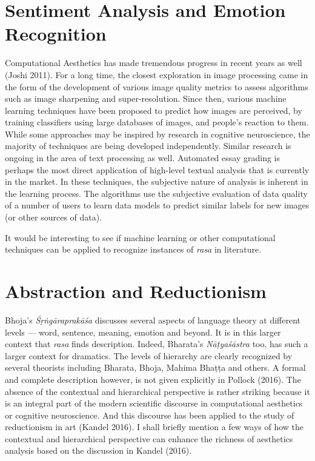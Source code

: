 \section*{Sentiment Analysis and Emotion Recognition}

Computational Aesthetics has made tremendous progress in recent years as well (Joshi 2011). For a long time, the closest exploration in image processing came in the form of the development of various image quality metrics to assess algorithms such as image sharpening and super-resolution. Since then, various machine learning techniques have been proposed to predict how images are perceived, by training classifiers using large databases of images, and people’s reaction to them. While some approaches may be inspired by research in cognitive neuroscience, the majority of techniques are being developed independently. Similar research is ongoing in the area of text processing as well. Automated essay grading is perhaps the most direct application of high-level textual analysis that is currently in the market. In these techniques, the subjective nature of analysis is inherent in the learning process. The algorithms use the subjective evaluation of data quality of a number of users to learn data models to predict similar labels for new images (or other sources of data).

It would be interesting to see if machine learning or other computational techniques can be applied to recognize instances of \textsl{rasa} in literature.\\[-21pt]

\section*{Abstraction and Reductionism}

Bhoja’s \textsl{Śṛṅgāraprakāśa} discusses several aspects of language theory at different levels --- word, sentence, meaning, emotion and beyond. It is in this larger context that \textsl{rasa} finds description. Indeed, Bharata’s \textsl{Nāṭyaśāstra}  too, has such a larger context for dramatics. The levels of hierarchy are clearly recognized by several theorists including Bharata, Bhoja, Mahima Bhaṭṭa and others. A formal and complete description however, is not given explicitly in Pollock (2016). The absence of the contextual and hierarchical perspective is rather striking because it is an integral part of the modern scientific discourse in computational aesthetics or cognitive neuroscience. And this discourse has been applied to the study of reductionism in art (Kandel 2016). I shall briefly mention a few ways of how the contextual and hierarchical perspective can enhance the richness of aesthetics analysis based on the discussion in Kandel (2016).


